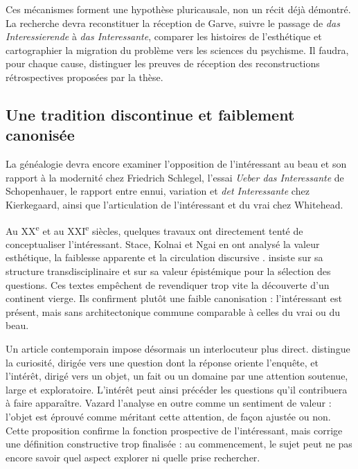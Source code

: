 \documentclass[11pt,a4paper]{article}
\begin{document}
Ces mécanismes forment une hypothèse pluricausale, non un récit déjà démontré.
La recherche devra reconstituer la réception de Garve, suivre le passage de
\emph{das Interessierende} à \emph{das Interessante}, comparer les histoires de
l'esthétique et cartographier la migration du problème vers les sciences du
psychisme. Il faudra, pour chaque cause, distinguer les preuves de réception des
reconstructions rétrospectives proposées par la thèse.

\subsection{Une tradition discontinue et faiblement canonisée}

La généalogie devra encore examiner l'opposition de l'intéressant au beau et son
rapport à la modernité chez Friedrich Schlegel, l'essai \emph{Ueber das
Interessante} de Schopenhauer, le rapport entre ennui, variation et
\emph{det Interessante} chez Kierkegaard, ainsi que l'articulation de
l'intéressant et du vrai chez Whitehead.

Au XX\textsuperscript{e} et au XXI\textsuperscript{e} siècles, quelques travaux
ont directement tenté de conceptualiser l'intéressant. Stace, Kolnai et Ngai en
ont analysé la valeur esthétique, la faiblesse apparente et la circulation
discursive
\parencite{stace1944interestingness,kolnai1964concept,ngai2008merely,ngai2012categories}.
\textcite{epstein2009interesting} insiste sur sa structure transdisciplinaire et
\textcite{grimm2011interesting} sur sa valeur épistémique pour la sélection des
questions. Ces textes empêchent de revendiquer trop vite la découverte d'un
continent vierge. Ils confirment plutôt une faible canonisation : l'intéressant
est présent, mais sans architectonique commune comparable à celles du vrai ou du
beau.

Un article contemporain impose désormais un interlocuteur plus direct.
\textcite{vazard2026inquiry} distingue la curiosité, dirigée vers une question
dont la réponse oriente l'enquête, et l'intérêt, dirigé vers un objet, un fait ou
un domaine par une attention soutenue, large et exploratoire. L'intérêt peut
ainsi précéder les questions qu'il contribuera à faire apparaître. Vazard
l'analyse en outre comme un sentiment de valeur : l'objet est éprouvé comme
méritant cette attention, de façon ajustée ou non. Cette proposition confirme
la fonction prospective de l'intéressant, mais corrige une définition
constructive trop finalisée : au commencement, le sujet peut ne pas encore
savoir quel aspect explorer ni quelle prise rechercher.
\end{document}

